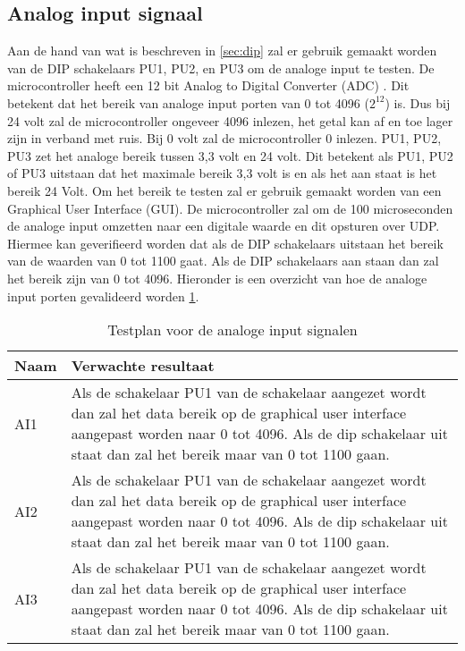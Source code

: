 \subsection{Analog input signaal}
Aan de hand van wat is beschreven in \ref{sec:dip} zal er gebruik gemaakt worden van de DIP schakelaars PU1, PU2, en PU3 om de analoge input te testen. De microcontroller heeft een 12 bit Analog to Digital Converter (ADC) \autocite{microcontroller}. Dit betekent dat het bereik van analoge input porten van 0 tot 4096 ($2^{12}$) is. Dus bij 24 volt zal de microcontroller ongeveer 4096 inlezen, het getal kan af en toe lager zijn in verband met ruis. Bij 0 volt zal de microcontroller 0 inlezen. PU1, PU2, PU3 zet het analoge bereik tussen 3,3 volt en 24 volt. Dit betekent als PU1, PU2 of PU3 uitstaan dat het maximale bereik 3,3 volt is en als het aan staat is het bereik 24 Volt. Om het bereik te testen zal er gebruik gemaakt worden van een Graphical User Interface (GUI). De microcontroller zal om de 100 microseconden de analoge input omzetten naar een digitale waarde en dit opsturen over UDP. Hiermee kan geverifieerd worden dat als de DIP schakelaars uitstaan het bereik van de waarden van 0 tot 1100 gaat. Als de DIP schakelaars aan staan dan zal het bereik zijn van 0 tot 4096. Hieronder is een overzicht van hoe de analoge input porten gevalideerd worden \ref{tab:hw_val_ai_testplan}.
\begin{table}[h!]
	\caption{Testplan voor de analoge input signalen}
	\begin{tabular}{lp{14.5cm}}
	\toprule
	\textbf{Naam} 	& \textbf{Verwachte resultaat} \\ \toprule
	AI1			& Als de schakelaar PU1 van de schakelaar aangezet wordt dan zal het data bereik op de graphical user interface aangepast worden naar 0 tot 4096. Als de dip schakelaar uit staat dan zal het bereik maar van 0 tot 1100 gaan.\\
	AI2			& Als de schakelaar PU1 van de schakelaar aangezet wordt dan zal het data bereik op de graphical user interface aangepast worden naar 0 tot 4096. Als de dip schakelaar uit staat dan zal het bereik maar van 0 tot 1100 gaan.\\
	AI3			& Als de schakelaar PU1 van de schakelaar aangezet wordt dan zal het data bereik op de graphical user interface aangepast worden naar 0 tot 4096. Als de dip schakelaar uit staat dan zal het bereik maar van 0 tot 1100 gaan.\\  \bottomrule
	\end{tabular}
	\label{tab:hw_val_ai_testplan}
\end{table}

